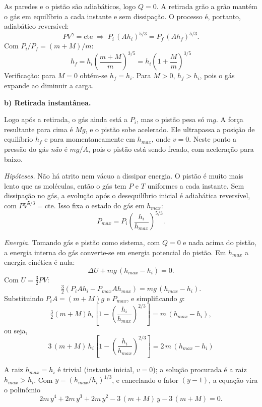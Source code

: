 \documentclass{article}%
\begin{document}
As paredes e o pistão são adiabáticos, logo $Q=0$. A retirada grão a grão mantém o gás em equilíbrio a cada instante e sem dissipação. O processo é, portanto, adiabático reversível:
\[
PV^{\gamma}=\text{cte}\;\Rightarrow\;P_i\,(Ah_i)^{5/3}=P_f\,(Ah_f)^{5/3}.
\]
Com $P_i/P_f=(m+M)/m$:
\[
\boxed{h_f=h_i\left(\frac{m+M}{m}\right)^{3/5}=h_i\left(1+\frac{M}{m}\right)^{3/5}}
\]
Verificação: para $M=0$ obtém-se $h_f=h_i$. Para $M>0$, $h_f>h_i$, pois o gás expande ao diminuir a carga.

\medskip
\textbf{b) Retirada instantânea.}

Logo após a retirada, o gás ainda está a $P_i$, mas o pistão pesa só $mg$. A força resultante para cima é $Mg$, e o pistão sobe acelerado. Ele ultrapassa a posição de equilíbrio $h_f$ e para momentaneamente em $h_{max}$, onde $v=0$. Neste ponto a pressão do gás \emph{não} é $mg/A$, pois o pistão está sendo freado, com aceleração para baixo.

\emph{Hipóteses.} Não há atrito nem vácuo a dissipar energia. O pistão é muito mais lento que as moléculas, então o gás tem $P$ e $T$ uniformes a cada instante. Sem dissipação no gás, a evolução após o desequilíbrio inicial é adiabática reversível, com $PV^{5/3}=\text{cte}$. Isso fixa o estado do gás em $h_{max}$:
\[
P_{max}=P_i\left(\frac{h_i}{h_{max}}\right)^{5/3}.
\]

\emph{Energia.} Tomando gás e pistão como sistema, com $Q=0$ e nada acima do pistão, a energia interna do gás converte-se em energia potencial do pistão. Em $h_{max}$ a energia cinética é nula:
\[
\Delta U+mg\,(h_{max}-h_i)=0 .
\]
Com $U=\tfrac32PV$:
\[
\tfrac32\left(P_iAh_i-P_{max}Ah_{max}\right)=mg\,(h_{max}-h_i).
\]
Substituindo $P_iA=(m+M)g$ e $P_{max}$, e simplificando $g$:
\[
\tfrac32 (m+M)h_i\left[1-\left(\frac{h_i}{h_{max}}\right)^{2/3}\right]=m\,(h_{max}-h_i),
\]
ou seja,
\[
\boxed{\,3\,(m+M)\,h_i\left[1-\left(\frac{h_i}{h_{max}}\right)^{2/3}\right]=2\,m\,(h_{max}-h_i)\,}
\]

A raiz $h_{max}=h_i$ é trivial (instante inicial, $v=0$); a solução procurada é a raiz $h_{max}>h_i$. Com $y=(h_{max}/h_i)^{1/3}$, e cancelando o fator $(y-1)$, a equação vira o polinômio
\[
2m\,y^4+2m\,y^3+2m\,y^2-3\,(m+M)\,y-3\,(m+M)=0 .
\]
\end{document}
